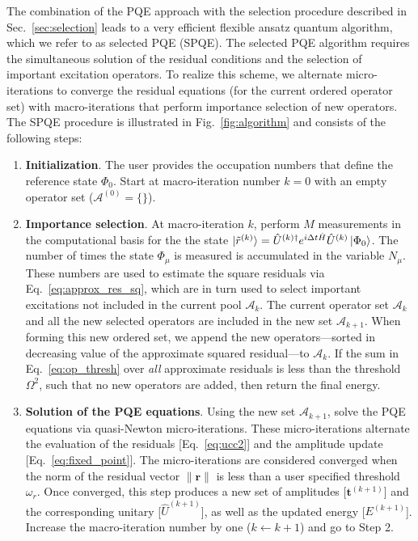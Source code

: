 \documentclass[aps,prx, reprint]{revtex4-2}
\providecommand{\normnorm}[1]{\lVert#1\rVert}
\newcommand*{\Uk}{\hat{U}^{(k)}}
\newcommand*{\Ukd}{\hat{U}^{(k)\dagger}}
\begin{document}
The combination of the PQE approach  with the selection procedure described in Sec.~\ref{sec:selection} leads to a very efficient  flexible ansatz quantum algorithm, which we refer to as selected PQE (SPQE).
The selected PQE algorithm requires the simultaneous solution of the residual conditions and the selection of important excitation operators.
To realize this scheme, we alternate micro-iterations to converge the residual equations (for the current ordered  operator set) with macro-iterations that perform importance selection of new operators.
The SPQE procedure is illustrated in Fig.~\ref{fig:algorithm} and consists of the following steps:
\begin{enumerate}
\item \textbf{Initialization}. The user provides the occupation numbers that define the reference state $\Phi_0$. Start at macro-iteration number $k = 0$ with an empty operator set ($\mathcal{A}^{(0)} = \{ \}$).

\item \textbf{Importance selection}. At macro-iteration $k$, perform $M$ measurements in the computational basis for the the state $\ket{\tilde{r}^{(k)}} = \Ukd e^{i \Delta t \hat{H}} \Uk \ket{\Phi_0}$.
The number of times the state $\Phi_\mu$ is measured is accumulated in the variable $N_\mu$. These numbers are used to estimate the square residuals via Eq.~\eqref{eq:approx_res_sq}, which are in turn used to select important excitations not included in the current pool $\mathcal{A}_{k}$.
The current operator set $\mathcal{A}_{k}$ and all the new selected operators are included in the new set $\mathcal{A}_{k + 1}$.
When forming this new ordered set, we append the new operators---sorted in decreasing value of the approximate squared residual---to $\mathcal{A}_{k}$.
If the sum in Eq.~\eqref{eq:op_thresh} over \textit{all} approximate residuals is less than the threshold $\Omega^2$, such that no new operators are added, then return the final energy.

\item \textbf{Solution of the PQE equations}. Using the new set $\mathcal{A}_{k + 1}$, solve the PQE equations via quasi-Newton micro-iterations.
These micro-iterations alternate the evaluation of the residuals [Eq.~\eqref{eq:ucc2}] and the amplitude update [Eq.~\eqref{eq:fixed_point}].
The micro-iterations are considered converged when the norm of the residual vector $\normnorm{\mathbf{r}}$ is less than a user specified threshold $\omega_r$.
Once converged, this step produces a new set of amplitudes [$\mathbf{t}^{(k + 1)}$] and the corresponding unitary [$\hat{U}^{(k + 1)}$], as well as the updated energy [$E^{(k + 1)}$].
Increase the macro-iteration number by one ($k \leftarrow k + 1$) and go to Step 2.
\end{enumerate}
\end{document}
